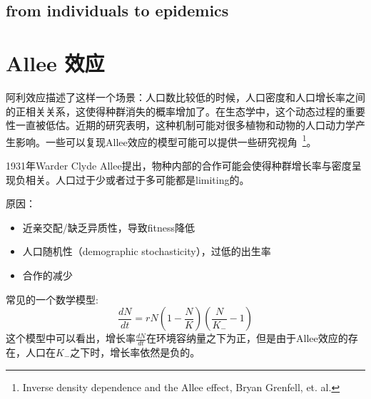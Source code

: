 \subsection{from individuals to epidemics}

\section{Allee 效应}

阿利效应描述了这样一个场景：人口数比较低的时候，人口密度和人口增长率之间的正相关关系，这使得种群消失的概率增加了。在生态学中，这个动态过程的重要性一直被低估。近期的研究表明，这种机制可能对很多植物和动物的人口动力学产生影响。一些可以复现Allee效应的模型可能可以提供一些研究视角~\footnote{Inverse density dependence and the Allee effect, Bryan Grenfell, et. al.}。

1931年Warder Clyde Allee提出，物种内部的合作可能会使得种群增长率与密度呈现负相关。人口过于少或者过于多可能都是limiting的。

原因：\begin{itemize}
    \item 近亲交配/缺乏异质性，导致fitness降低
    \item 人口随机性（demographic stochasticity），过低的出生率
    \item 合作的减少
\end{itemize}

常见的一个数学模型: \begin{equation}
    \frac{d N}{d t}=r N\left(1-\frac{N}{K}\right)\left(\frac{N}{K_{-}}-1\right)
    \end{equation}
这个模型中可以看出，增长率$\frac{dN}{dt}$在环境容纳量之下为正，但是由于Allee效应的存在，人口在$K_{-}$之下时，增长率依然是负的。